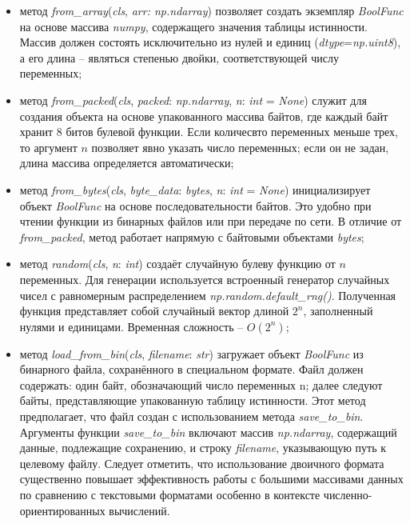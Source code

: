 \begin{itemize}
    \item метод \textit{from\_array}(\textit{cls}, \textit{arr: np.ndarray}) позволяет создать экземпляр \textit{BoolFunc} на основе массива \textit{numpy}, содержащего значения таблицы истинности. Массив должен состоять исключительно из нулей и единиц (\textit{dtype}=\textit{np.uint8}), а его длина – являться степенью двойки, соответствующей числу переменных;
    \item метод \textit{from\_packed}(\textit{cls}, \textit{packed}: \textit{np.ndarray}, \textit{n}: \textit{int} = \textit{None}) служит для создания объекта на основе упакованного массива байтов, где каждый байт хранит 8 битов булевой функции. Если количесвто переменных меньше трех, то аргумент $n$ позволяет явно указать число переменных; если он не задан, длина массива определяется автоматически;
    \item метод \textit{from\_bytes}(\textit{cls}, \textit{byte\_data}: \textit{bytes}, \textit{n}: \textit{int} = \textit{None}) инициализирует объект \textit{BoolFunc} на основе последовательности байтов. Это удобно при чтении функции из бинарных файлов или при передаче по сети. В отличие от \textit{from\_packed}, метод работает напрямую с байтовыми объектами \textit{bytes};
    \item метод \textit{random}(\textit{cls}, \textit{n}: \textit{int}) создаёт случайную булеву функцию от $n$ переменных. Для генерации используется встроенный генератор случайных чисел с равномерным распределением \textit{np.random.default\_rng()}. Полученная функция представляет собой случайный вектор длиной $2^n$, заполненный нулями и единицами. Временная сложность – $O(2^n)$;
    \item метод \textit{load\_from\_bin}(\textit{cls}, \textit{filename}: \textit{str}) загружает объект \textit{BoolFunc} из бинарного файла, сохранённого в специальном формате. Файл должен содержать: один байт, обозначающий число переменных n; далее следуют байты, представляющие упакованную таблицу истинности. Этот метод предполагает, что файл создан с использованием метода \textit{save\_to\_bin}. Аргументы функции \textit{save\_to\_bin} включают массив \textit{np.ndarray}, содержащий данные, подлежащие сохранению, и строку \textit{filename}, указывающую путь к целевому файлу. Следует отметить, что использование двоичного формата существенно повышает эффективность работы с большими массивами данных по сравнению с текстовыми форматами особенно в контексте численно-ориентированных вычислений.
\end{itemize}

